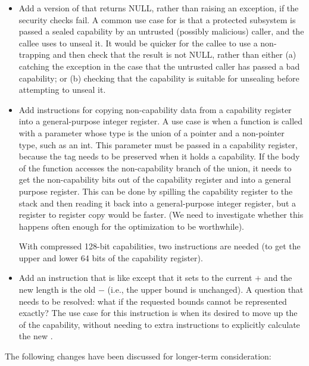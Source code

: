 \begin{itemize}
\item
  Add a version of  that returns NULL, rather than
  raising an exception, if the security checks fail. A common use case
  for  is that a protected subsystem is passed a sealed
  capability by an untrusted (possibly malicious) caller, and the callee uses
   to unseal it. It would be quicker for the callee
  to use a non-trapping  and then check that the result
  is not NULL, rather than either (a) catching the exception in the case that
  the untrusted caller has passed a bad capability; or (b) checking that
  the capability is suitable for unsealing before attempting to unseal it.

\item
  Add instructions for copying non-capability data from a capability register
  into a general-purpose integer register. A use case is when a function is called
  with a parameter whose type is the union of a pointer and a non-pointer type,
  such as an int. This parameter must be passed in a capability register, because
  the tag needs to be preserved when it holds a capability. If the body of
  the function accesses the non-capability branch of the union, it needs to
  get the non-capability bits out of the capability register and into a general
  purpose register. This can be done by spilling the capability register to the
  stack and then reading it back into a general-purpose integer register, but a register
  to register copy would be faster. (We need to investigate whether this happens
  often enough for the optimization to be worthwhile).

  With compressed 128-bit capabilities, two instructions are needed (to get
  the upper and lower 64 bits of the capability register).

\item
  Add an instruction that is like  except that it
  sets \cbase{} to the current \cbase{} $+$ \coffset{} and the new length
  is the old \clength{} $-$ \coffset{} (i.e., the upper bound is unchanged).
  A question that needs to be resolved: what if the requested bounds cannot
  be represented exactly? The use case for this instruction is when its
  desired to move up the \cbase{} of the capability, without needing to
  extra instructions to explicitly calculate the new \clength{}.
\end{itemize}

The following changes have been discussed for longer-term consideration:

